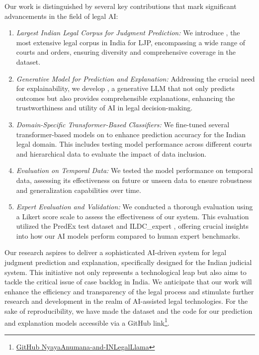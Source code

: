 Our work is distinguished by several key contributions that mark significant advancements in the field of legal AI:
%
\begin{enumerate}
%
\item \emph{Largest Indian Legal Corpus for Judgment Prediction:} We introduce \texttt{\named}, the most extensive legal corpus in India for LJP, encompassing a wide range of courts and orders, ensuring diversity and comprehensive coverage in the dataset.
%
\item \emph{Generative Model for Prediction and Explanation:} Addressing the crucial need for explainability, we develop \texttt{\namel}, a generative LLM that not only predicts outcomes but also provides comprehensible explanations, enhancing the trustworthiness and utility of AI in legal decision-making.
%
\item \emph{Domain-Specific Transformer-Based Classifiers:} We fine-tuned several transformer-based models on \texttt{\named} to enhance prediction accuracy for the Indian legal domain. This includes testing model performance across different courts and hierarchical data to evaluate the impact of data inclusion.
%
\item \emph{Evaluation on Temporal Data:} We tested the model performance on temporal data, assessing its effectiveness on future or unseen data to ensure robustness and generalization capabilities over time.
%
\item \emph{Expert Evaluation and Validation:} We conducted a thorough evaluation using a Likert score scale to assess the effectiveness of our system. This evaluation utilized the PredEx test dataset \cite{nigam2024legaljudgmentreimaginedpredex} and ILDC\_expert \cite{malik-etal-2021-ildc}, offering crucial insights into how our AI models perform compared to human expert benchmarks.
%
\end{enumerate}

Our research aspires to deliver a sophisticated AI-driven system for legal judgment prediction and explanation, specifically designed for the Indian judicial system. This initiative not only represents a technological leap but also aims to tackle the critical issue of case backlog in India. We anticipate that our work will enhance the efficiency and transparency of the legal process and stimulate further research and development in the realm of AI-assisted legal technologies. 
For the sake of reproducibility, we have made the \texttt{\named} dataset and the code for our prediction and explanation models accessible via a GitHub link\footnote{\href{https://github.com/ShubhamKumarNigam/NyayaAnumana-and-INLegalLlama}{GitHub NyayaAnumana-and-INLegalLlama}}. 
